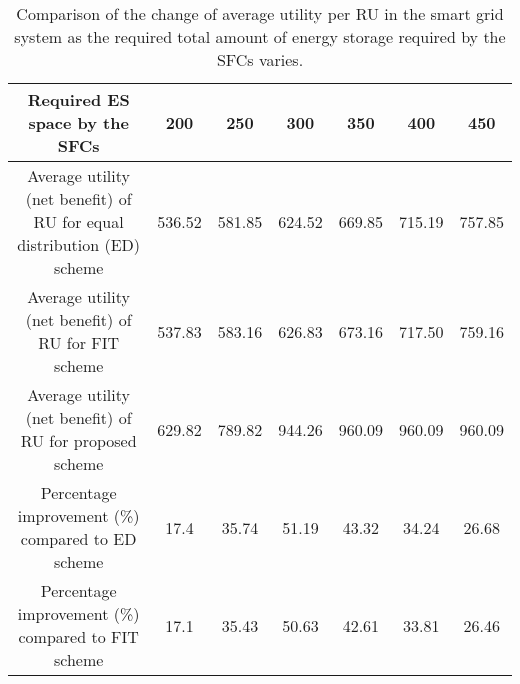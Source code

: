 \documentclass[journal,10pt]{IEEEtran}
\begin{document}
\begin{table*}[t]
\centering
\caption{Comparison of the change of average utility per RU in the smart grid system as the required total amount of energy storage required by the SFCs varies.}
\begin{tabular}{|c|c|c|c|c|c|c|}
\hline
Required ES space by the SFCs & 200 & 250 & 300 & 350 & 400 & 450\\
\hline
Average utility (net benefit) of RU for equal distribution (ED) scheme & 536.52 & 581.85 & 624.52 & 669.85 & 715.19 & 757.85\\
\hline
Average utility (net benefit) of RU for FIT scheme & 537.83 & 583.16 & 626.83 & 673.16 & 717.50 & 759.16\\
\hline
Average utility (net benefit) of RU for proposed scheme & 629.82 & 789.82 & 944.26 & 960.09 & 960.09 & 960.09\\
\hline
Percentage improvement (\%) compared to ED scheme &17.4 & 35.74 & 51.19 & 43.32 & 34.24 & 26.68\\
\hline
Percentage improvement (\%) compared to FIT scheme &17.1 & 35.43 & 50.63 & 42.61 & 33.81 & 26.46\\
\hline
\end{tabular}
\label{table:2}
\end{table*}
\end{document}
